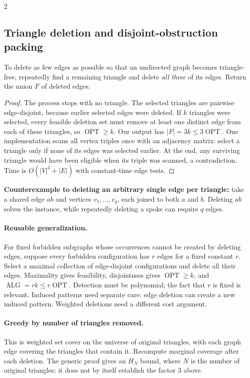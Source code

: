 \documentclass[8pt]{extarticle}
\theoremstyle{definition}
\newcommand{\OPT}{\operatorname{OPT}}
\newcommand{\ALG}{\operatorname{ALG}}
\begin{document}
\begin{multicols*}{2}
\subsection{Triangle deletion and disjoint-obstruction packing}
\label{gre:triangles}
To delete as few edges as possible so that an undirected graph becomes triangle-free,
repeatedly find a remaining triangle and delete \emph{all three} of its edges. Return the
union $F$ of deleted edges.
\begin{proof}
The process stops with no triangle. The selected triangles are pairwise edge-disjoint,
because earlier selected edges were deleted. If $k$ triangles were selected, every feasible
deletion set must remove at least one distinct edge from each of these triangles, so
$\OPT\ge k$. Our output has $|F|=3k\le3\OPT$.
One implementation scans all vertex triples once with an adjacency matrix: select a
triangle only if none of its edges was selected earlier. At the end, any surviving triangle
would have been eligible when its triple was scanned, a contradiction. Time is
$O(|V|^3+|E|)$ with constant-time edge tests.
\end{proof}
\textbf{Counterexample to deleting an arbitrary single edge per triangle:}
take a shared edge $ab$ and vertices $v_1,\ldots,v_q$, each joined to both $a$ and $b$.
Deleting $ab$ solves the instance, while repeatedly deleting a spoke can require $q$ edges.

\paragraph{Reusable generalization.}
For fixed forbidden subgraphs whose occurrences cannot be created by deleting edges,
suppose every forbidden configuration has $r$ edges for a fixed constant $r$. Select a maximal
collection of edge-disjoint configurations and delete all their edges. Maximality gives
feasibility, disjointness gives $\OPT\ge k$, and $\ALG=rk\le r\OPT$. Detection must be
polynomial; the fact that $r$ is fixed is relevant. Induced patterns need separate care:
edge deletion can create a new induced pattern. Weighted deletions need a different cost argument.

\paragraph{Greedy by number of triangles removed.}
This is weighted set cover on the universe of original triangles, with each graph edge
covering the triangles that contain it. Recompute marginal coverage after each deletion.
The generic proof gives an $H_N$ bound, where $N$ is the number of original triangles;
it does not by itself establish the factor 3 above.




\end{multicols*}
\end{document}
